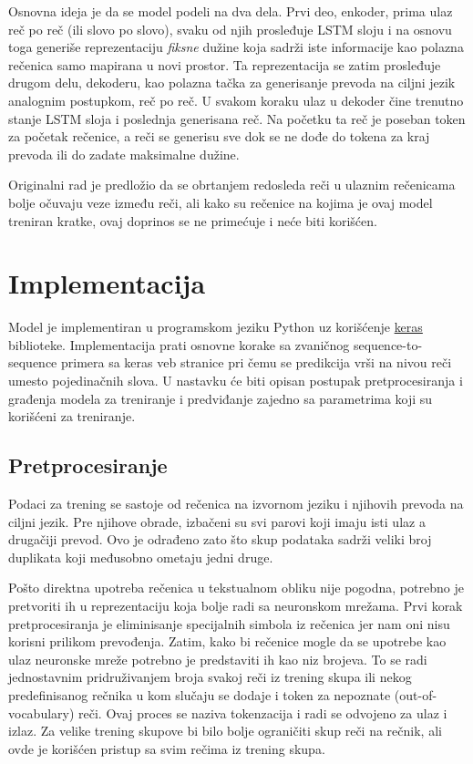 \documentclass[a4paper]{article}
\begin{document}
Osnovna ideja je da se model podeli na dva dela.
Prvi deo, enkoder, prima ulaz reč po reč (ili slovo po slovo), svaku od njih prosleđuje LSTM sloju i na osnovu toga generiše reprezentaciju \textit{fiksne} dužine koja sadrži iste informacije kao polazna rečenica samo mapirana u novi prostor.
Ta reprezentacija se zatim prosleđuje drugom delu, dekoderu, kao polazna tačka za generisanje prevoda na ciljni jezik analognim postupkom, reč po reč. U svakom koraku ulaz u dekoder čine trenutno stanje LSTM sloja i poslednja generisana reč.
Na početku ta reč je poseban token za početak rečenice, a reči se generisu sve dok se ne dođe do tokena za kraj prevoda ili do zadate maksimalne dužine.

Originalni rad je predložio da se obrtanjem redosleda reči u ulaznim rečenicama bolje očuvaju veze između reči, ali kako su rečenice na kojima je ovaj model treniran kratke, ovaj doprinos se ne primećuje i neće biti korišćen.

\section{Implementacija}

Model je implementiran u programskom jeziku Python uz korišćenje \href{https://keras.io/}{keras} biblioteke. Implementacija prati osnovne korake sa zvaničnog sequence-to-sequence primera sa keras veb stranice \cite{keras_seq2seq} pri čemu se predikcija vrši na nivou reči umesto pojedinačnih slova.
U nastavku će biti opisan postupak pretprocesiranja i građenja modela za treniranje i predviđanje zajedno sa parametrima koji su korišćeni za treniranje.

\subsection{Pretprocesiranje}

Podaci za trening se sastoje od rečenica na izvornom jeziku i njihovih prevoda na ciljni jezik.
Pre njihove obrade, izbačeni su svi parovi koji imaju isti ulaz a drugačiji prevod. Ovo je odrađeno zato što skup podataka sadrži veliki broj duplikata koji međusobno ometaju jedni druge.

Pošto direktna upotreba rečenica u tekstualnom obliku nije pogodna, potrebno je pretvoriti ih u reprezentaciju koja bolje radi sa neuronskom mrežama.
Prvi korak pretprocesiranja je eliminisanje specijalnih simbola iz rečenica jer nam oni nisu korisni prilikom prevođenja.
Zatim, kako bi rečenice mogle da se upotrebe kao ulaz neuronske mreže potrebno je predstaviti ih kao niz brojeva. To se radi jednostavnim pridruživanjem broja svakoj reči iz trening skupa ili nekog predefinisanog rečnika u kom slučaju se dodaje i token za nepoznate (out-of-vocabulary) reči. Ovaj proces se naziva tokenzacija i radi se odvojeno za ulaz i izlaz.
Za velike trening skupove bi bilo bolje ograničiti skup reči na rečnik, ali ovde je korišćen pristup sa svim rečima iz trening skupa.
\end{document}
